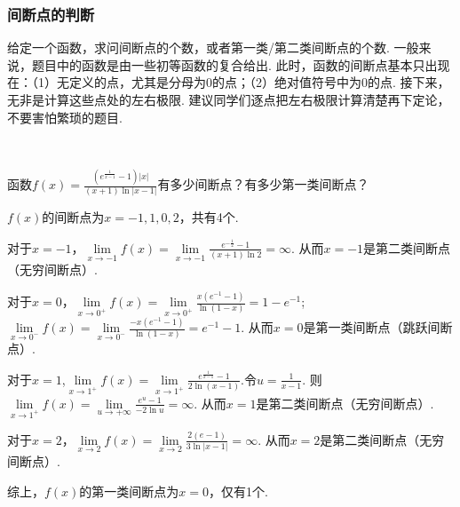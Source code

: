 \subsubsection{间断点的判断}\par
给定一个函数，求问间断点的个数，或者第一类/第二类间断点的个数. 一般来说，题目中的函数是由一些初等函数的复合给出.
此时，函数的间断点基本只出现在：（1）无定义的点，尤其是分母为0的点；（2）绝对值符号中为0的点.
接下来，无非是计算这些点处的左右极限. 建议同学们逐点把左右极限计算清楚再下定论，不要害怕繁琐的题目.\par
~\par


\begin{example}
\label{ex:ch01-35}
函数$f(x)=\displaystyle\frac{\left( e^{\frac{1}{x-1}}-1 \right)|x|}{(x+1)\ln|x-1|}$有多少间断点？有多少第一类间断点？
\end{example}

\begin{solution}
$f(x)$的间断点为$x=-1,1,0,2$，共有4个.\par
对于$x=-1$，$\lim\limits_{x \to -1}f(x)= \lim\limits_{x \to -1} \displaystyle\frac{e^{-\frac{1}{2}}-1}{(x+1)\ln 2} =\infty$. 从而$x=-1$是第二类间断点（无穷间断点）.\par
对于$x=0$，$\lim\limits_{x \to 0^{+}}f(x)=\lim\limits_{x \to 0^{+}}\displaystyle\frac{x(e^{-1}-1)}{\ln(1-x)}=1-e^{-1}$;
  $\lim\limits_{x \to 0^{-}}f(x)=\lim\limits_{x \to 0^{-}}\displaystyle\frac{-x(e^{-1}-1)}{\ln(1-x)}=e^{-1}-1$. 从而$x=0$是第一类间断点（跳跃间断点）.\par
对于$x=1$,$\lim\limits_{x \to 1^{+}}f(x) = \lim\limits_{x \to 1^{+}} \displaystyle\frac{e^{\frac{1}{x-1}}-1}{2\ln(x-1)}$.令$u=\displaystyle\frac{1}{x-1}$. 则$\lim\limits_{x \to 1^{+}}f(x) = \lim\limits_{u \to +\infty}\displaystyle\frac{e^{u}-1}{-2\ln u}=\infty$. 从而$x=1$是第二类间断点（无穷间断点）.\par
对于$x=2$，$\lim\limits_{x \to 2}f(x) = \lim\limits_{x \to 2}\displaystyle\frac{2(e-1)}{3\ln|x-1|}=\infty$. 从而$x=2$是第二类间断点（无穷间断点）.\par
综上，$f(x)$的第一类间断点为$x=0$，仅有1个.
\end{solution}

